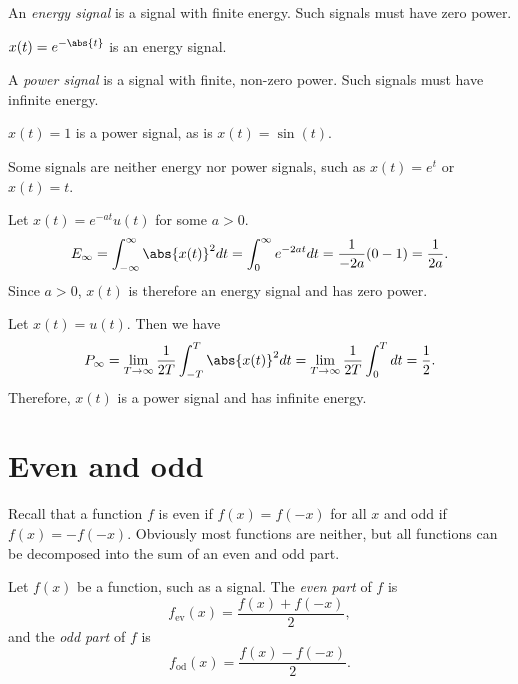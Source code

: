 \documentclass[12pt]{article}
\begin{document}
\begin{defn}
    An \emph{energy signal} is a signal with finite energy. Such signals must have zero power.
\end{defn}

\begin{exmp}
    $x(t) = e^{-\abs{t}}$ is an energy signal.
\end{exmp}

\begin{defn}
    A \emph{power signal} is a signal with finite, non-zero power. Such signals must have infinite energy.
\end{defn}

\begin{exmp}
    $x(t) = 1$ is a power signal, as is $x(t) = \sin(t)$.
\end{exmp}

Some signals are neither energy nor power signals, such as $x(t) = e^t$ or $x(t) = t$.

\begin{exmp}
    Let $x(t) = e^{-at}u(t)$ for some $a > 0$.
    \[E_{\infty} = \int_{-\infty}^{\infty}\abs{x(t)}^2dt = \int_{0}^{\infty}e^{-2at}dt = \frac{1}{-2a}(0 - 1) = \frac{1}{2a}.\] Since $a > 0$, $x(t)$ is therefore an energy signal and has zero power.
\end{exmp}

\begin{exmp}
    Let $x(t) = u(t)$. Then we have
    \[P_{\infty} = \lim_{T\to\infty}\frac{1}{2T}\int_{-T}^{T}\abs{x(t)}^2dt = \lim_{T\to\infty}\frac{1}{2T}\int_{0}^{T}dt = \frac{1}{2}.\] Therefore, $x(t)$ is a power signal and has infinite energy.
\end{exmp}

\section{Even and odd}

Recall that a function $f$ is even if $f(x) = f(-x)$ for all $x$ and odd if $f(x) = -f(-x)$. Obviously most functions are neither, but all functions can be decomposed into the sum of an even and odd part.

\begin{defn}
    Let $f(x)$ be a function, such as a signal. The \emph{even part} of $f$ is \[f_{\mathrm{ev}}(x) = \frac{f(x) + f(-x)}{2},\] and the \emph{odd part} of $f$ is \[f_{\mathrm{od}}(x) = \frac{f(x) - f(-x)}{2}.\]
\end{defn}
\end{document}
